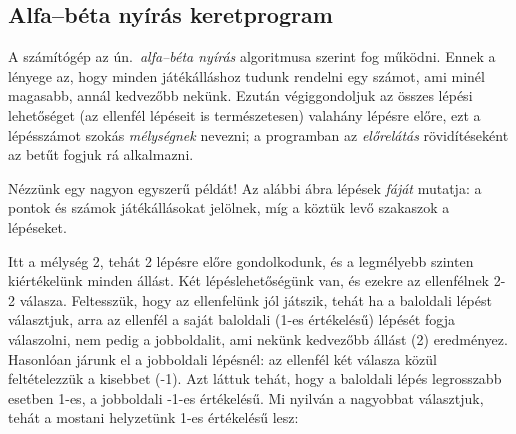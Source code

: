 \subsection*{Alfa--béta nyírás keretprogram}
A számítógép az ún.~\emph{alfa--béta nyírás}
algoritmusa szerint fog működni. Ennek a lényege az,
hogy minden játékálláshoz tudunk rendelni egy
számot, ami minél magasabb, annál kedvezőbb
nekünk. Ezután végiggondoljuk az összes lépési
lehetőséget (az ellenfél lépéseit is természetesen)
valahány lépésre előre, ezt a lépésszámot szokás
\emph{mélységnek} nevezni; a programban az
\emph{előrelátás} rövidítéseként az  betűt
fogjuk rá alkalmazni.

Nézzünk egy nagyon egyszerű példát! Az alábbi ábra
lépések \emph{fáját} mutatja: a pontok és számok
játékállásokat jelölnek, míg a köztük levő szakaszok
a lépéseket.

\begin{center}
\end{center}

Itt a mélység 2, tehát 2 lépésre előre gondolkodunk,
és a legmélyebb szinten kiértékelünk minden
állást. Két lépéslehetőségünk van, és ezekre az
ellenfélnek 2-2 válasza. Feltesszük, hogy az
ellenfelünk jól játszik, tehát ha a baloldali lépést
választjuk, arra az ellenfél a saját baloldali (1-es
értékelésű) lépését fogja válaszolni, nem pedig a
jobboldalit, ami nekünk kedvezőbb állást (2)
eredményez. Hasonlóan járunk el a jobboldali
lépésnél: az ellenfél két válasza közül
feltételezzük a kisebbet (-1). Azt láttuk tehát,
hogy a baloldali lépés legrosszabb esetben 1-es, a
jobboldali -1-es értékelésű. Mi nyilván a nagyobbat
választjuk, tehát a mostani helyzetünk 1-es
értékelésű lesz:

